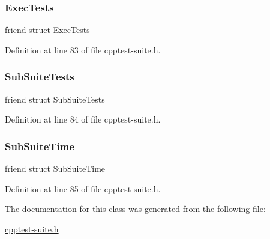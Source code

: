 \subsubsection{\texorpdfstring{Exec\+Tests}{ExecTests}}
{\footnotesize\ttfamily friend struct Exec\+Tests\hspace{0.3cm}{\ttfamily [friend]}}



Definition at line 83 of file cpptest-\/suite.\+h.

\mbox{\label{class_test_1_1_suite_a901d2d72cc93e087c94d99680f65fa8e}} 
\subsubsection{\texorpdfstring{Sub\+Suite\+Tests}{SubSuiteTests}}
{\footnotesize\ttfamily friend struct Sub\+Suite\+Tests\hspace{0.3cm}{\ttfamily [friend]}}



Definition at line 84 of file cpptest-\/suite.\+h.

\mbox{\label{class_test_1_1_suite_a5933776e455e5bd9ad1d4a8b1c591aa2}} 
\subsubsection{\texorpdfstring{Sub\+Suite\+Time}{SubSuiteTime}}
{\footnotesize\ttfamily friend struct Sub\+Suite\+Time\hspace{0.3cm}{\ttfamily [friend]}}



Definition at line 85 of file cpptest-\/suite.\+h.



The documentation for this class was generated from the following file\+:\begin{DoxyCompactItemize}
\item 
\mbox{\hyperlink{cpptest-suite_8h}{cpptest-\/suite.\+h}}\end{DoxyCompactItemize}
